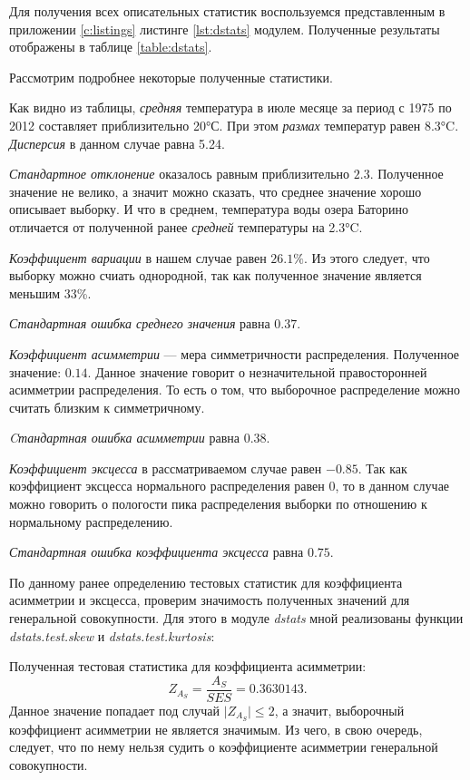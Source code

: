 Для получения всех описательных статистик воспользуемся представленным в приложении \ref{c:listings} листинге \ref{lst:dstats} модулем. Полученные результаты отображены в таблице \ref{table:dstats}.



Рассмотрим подробнее некоторые полученные статистики.

Как видно из таблицы, \textit{средняя} температура в июле месяце за период с 1975 по 2012 составляет приблизительно 20°С. При этом \textit{размах} температур равен 8.3°C. \textit{Дисперсия} в данном случае равна 5.24.

\textit{Стандартное отклонение} оказалось равным приблизительно $2.3$. Полученное значение не велико, а значит можно сказать, что среднее значение хорошо описывает выборку. И что в среднем, температура воды озера Баторино отличается от полученной ранее \textit{средней} температуры на 2.3°C.

\textit{Коэффициент вариации} в нашем случае равен $26.1\%$. Из этого следует, что выборку можно счиать однородной, так как полученное значение является меньшим 33\%.

\textit{Стандартная ошибка среднего значения} равна $0.37$.

\textit{Коэффициент асимметрии} --- мера симметричности распределения. Полученное значение: $0.14$. Данное значение говорит о незначительной правосторонней асимметрии распределения. То есть о том, что выборочное распределение можно считать близким к симметричному.

\textit{Cтандартная ошибка асимметрии} равна $0.38$.

\textit{Коэффициент эксцесса} в рассматриваемом случае равен $-0.85$. Так как коэффициент эксцесса нормального распределения равен $0$, то в данном случае можно говорить о пологости пика распределения выборки по отношению к нормальному распределению. 

\textit{Стандартная ошибка коэффициента эксцесса} равна $0.75$. 

По данному ранее определению тестовых статистик для коэффициента асимметрии и эксцесса, проверим значимость полученных значений для генеральной совокупности. Для этого в модуле \textit{dstats} мной реализованы функции \textit{dstats.test.skew} и \textit{dstats.test.kurtosis}:

Полученная тестовая статистика для коэффициента асимметрии:
\begin{equation*}
	Z_{A_S} = \frac{A_S}{SES} = 0.3630143.
\end{equation*}
Данное значение попадает под случай $\vert Z_{A_S} \vert \le 2$, а значит, выборочный коэффициент асимметрии не является значимым. Из чего, в свою очередь, следует, что по нему нельзя судить о коэффициенте асимметрии генеральной совокупности.


